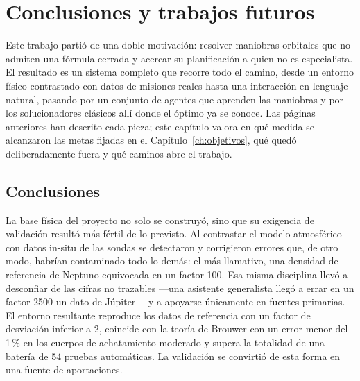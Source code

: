 \chapter{Conclusiones y trabajos futuros}
\label{ch:conclusiones}

Este trabajo partió de una doble motivación: resolver maniobras orbitales que no admiten una fórmula cerrada y acercar su planificación a quien no es especialista. El resultado es un sistema completo que recorre todo el camino, desde un entorno físico contrastado con datos de misiones reales hasta una interacción en lenguaje natural, pasando por un conjunto de agentes que aprenden las maniobras y por los solucionadores clásicos allí donde el óptimo ya se conoce. Las páginas anteriores han descrito cada pieza; este capítulo valora en qué medida se alcanzaron las metas fijadas en el Capítulo~\ref{ch:objetivos}, qué quedó deliberadamente fuera y qué caminos abre el trabajo.

\section{Conclusiones}

La base física del proyecto no solo se construyó, sino que su exigencia de validación resultó más fértil de lo previsto. Al contrastar el modelo atmosférico con datos in-situ de las sondas se detectaron y corrigieron errores que, de otro modo, habrían contaminado todo lo demás: el más llamativo, una densidad de referencia de Neptuno equivocada en un factor 100. Esa misma disciplina llevó a desconfiar de las cifras no trazables ---una asistente generalista llegó a errar en un factor 2500 un dato de Júpiter--- y a apoyarse únicamente en fuentes primarias. El entorno resultante reproduce los datos de referencia con un factor de desviación inferior a 2, coincide con la teoría de Brouwer con un error menor del 1\,\% en los cuerpos de achatamiento moderado y supera la totalidad de una batería de 54 pruebas automáticas. La validación se convirtió de esta forma en una fuente de aportaciones.

